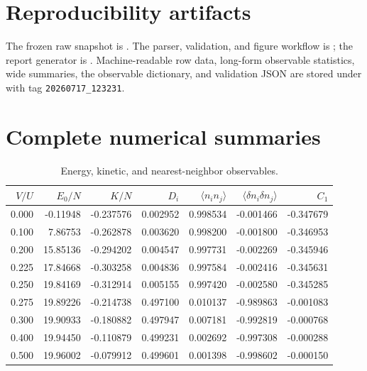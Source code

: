 \documentclass[10pt]{article}
\begin{document}
\section*{Reproducibility artifacts}
The frozen raw snapshot is
.  The parser, validation, and figure workflow is
; the report generator is
.  Machine-readable row data, long-form
observable statistics, wide summaries, the observable dictionary, and validation
JSON are stored under  with tag \texttt{20260717\_123231}.

\appendix
\section{Complete numerical summaries}

\begin{table}[!htbp]
\centering\scriptsize
\caption{Energy, kinetic, and nearest-neighbor observables.}
\begin{tabular}{rrrrrrr}
\toprule
$V/U$ & $E_0/N$ & $K/N$ & $D_i$ & $\langle n_i n_j\rangle$ &
$\langle\delta n_i\delta n_j\rangle$ & $C_1$\\
\midrule
0.000 & -0.11948 & -0.237576 & 0.002952 & 0.998534 & -0.001466 & -0.347679 \\
0.100 & 7.86753 & -0.262878 & 0.003620 & 0.998200 & -0.001800 & -0.346953 \\
0.200 & 15.85136 & -0.294202 & 0.004547 & 0.997731 & -0.002269 & -0.345946 \\
0.225 & 17.84668 & -0.303258 & 0.004836 & 0.997584 & -0.002416 & -0.345631 \\
0.250 & 19.84169 & -0.312914 & 0.005155 & 0.997420 & -0.002580 & -0.345285 \\
0.275 & 19.89226 & -0.214738 & 0.497100 & 0.010137 & -0.989863 & -0.001083 \\
0.300 & 19.90933 & -0.180882 & 0.497947 & 0.007181 & -0.992819 & -0.000768 \\
0.400 & 19.94450 & -0.110879 & 0.499231 & 0.002692 & -0.997308 & -0.000288 \\
0.500 & 19.96002 & -0.079912 & 0.499601 & 0.001398 & -0.998602 & -0.000150 \\
\bottomrule
\end{tabular}
\end{table}
\end{document}
